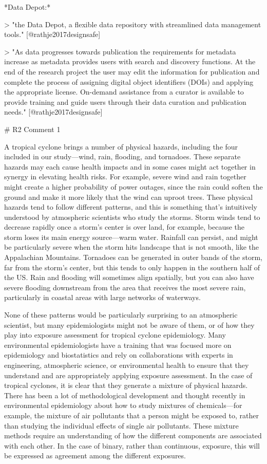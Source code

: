*Data Depot:*

> "the Data Depot, a flexible data repository with streamlined data management
tools." [@rathje2017designsafe]

> "As data progresses towards publication the requirements for metadata 
increase as metadata provides users with search and discovery functions. At
the end of the research project the user may edit the information for 
publication and complete the process of assigning digital object identifiers
(DOIs) and applying the appropriate license. On-demand assistance from a 
curator is available to provide training and guide users through their data
curation and publication needs." [@rathje2017designsafe]

# R2 Comment 1


A tropical cyclone brings a number of physical hazards, including the four 
included in our study---wind, rain, flooding, and tornadoes. These separate 
hazards may each cause health impacts and in some cases might act together 
in synergy in elevating health risks. For example, severe wind and rain 
together might create a higher probability of power outages, since the rain 
could soften the ground and make it more likely that the wind can uproot 
trees. These physical hazards tend to follow different patterns, and this is
something that's intuitively understood by atmospheric scientists who study 
the storms. Storm winds tend to decrease rapidly once a storm's center is 
over land, for example, because the storm loses its main energy source---warm
water. Rainfall can persist, and might be particularly severe when the storm 
hits landscape that is not smooth, like the Appalachian Mountains. Tornadoes
can be generated in outer bands of the storm, far from the storm's center, 
but this tends to only happen in the southern half of the US. Rain and flooding
will sometimes align spatially, but you can also have severe flooding downstream
from the area that receives the most severe rain, particularly in coastal areas
with large networks of waterways.

None of these patterns would be particularly surprising to an atmospheric scientist, 
but many epidemiologists might not be aware of them, or of how they play into
exposure assessment for tropical cyclone epidemiology. Many environmental 
epidemiologists have a training that was focused more on epidemiology and 
biostatistics and rely on collaborations with experts in engineering,
atmospheric science, or environmental health to ensure that they understand
and are appropriately applying exposure assessment. In the case of tropical 
cyclones, it is clear that they generate a mixture of physical hazards. 
There has been a lot of methodological development and thought recently in 
environmental epidemiology about how to study mixtures of chemicals---for example, 
the mixture of air pollutants that a person might be exposed to, rather than 
studying the individual effects of single air pollutants. 
These mixture methods require an understanding of how the different components
are associated with each other. In the case of binary, rather than continuous,
exposure, this will be expressed as agreement among the different exposures.

